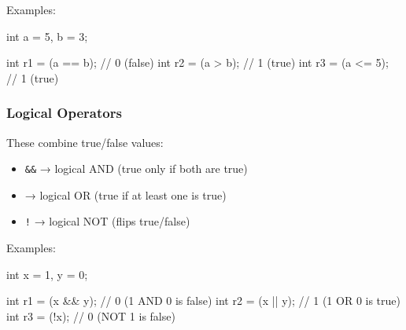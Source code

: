 \documentclass[
  letterpaper,
  DIV=11,
  numbers=noendperiod]{scrreprt}
\newenvironment{Shaded}{\begin{snugshade}}{\end{snugshade}}
\newcommand{\CommentTok}[1]{\textcolor[rgb]{0.37,0.37,0.37}{#1}}
\newcommand{\DataTypeTok}[1]{\textcolor[rgb]{0.68,0.00,0.00}{#1}}
\newcommand{\DecValTok}[1]{\textcolor[rgb]{0.68,0.00,0.00}{#1}}
\newcommand{\NormalTok}[1]{\textcolor[rgb]{0.00,0.23,0.31}{#1}}
\newcommand{\OperatorTok}[1]{\textcolor[rgb]{0.37,0.37,0.37}{#1}}
\providecommand{\tightlist}{%
  \setlength{\itemsep}{0pt}\setlength{\parskip}{0pt}}
\begin{document}
Examples:

\begin{Shaded}
\begin{Highlighting}[]
\DataTypeTok{int}\NormalTok{ a }\OperatorTok{=} \DecValTok{5}\OperatorTok{,}\NormalTok{ b }\OperatorTok{=} \DecValTok{3}\OperatorTok{;}

\DataTypeTok{int}\NormalTok{ r1 }\OperatorTok{=} \OperatorTok{(}\NormalTok{a }\OperatorTok{==}\NormalTok{ b}\OperatorTok{);}  \CommentTok{// 0 (false)}
\DataTypeTok{int}\NormalTok{ r2 }\OperatorTok{=} \OperatorTok{(}\NormalTok{a }\OperatorTok{\textgreater{}}\NormalTok{ b}\OperatorTok{);}   \CommentTok{// 1 (true)}
\DataTypeTok{int}\NormalTok{ r3 }\OperatorTok{=} \OperatorTok{(}\NormalTok{a }\OperatorTok{\textless{}=} \DecValTok{5}\OperatorTok{);}  \CommentTok{// 1 (true)}
\end{Highlighting}
\end{Shaded}

\subsubsection{Logical Operators}\label{logical-operators}

These combine true/false values:

\begin{itemize}
\tightlist
\item
  \texttt{\&\&} → logical AND (true only if both are true)
\item
  \texttt{\textbar{}\textbar{}} → logical OR (true if at least one is
  true)
\item
  \texttt{!} → logical NOT (flips true/false)
\end{itemize}

Examples:

\begin{Shaded}
\begin{Highlighting}[]
\DataTypeTok{int}\NormalTok{ x }\OperatorTok{=} \DecValTok{1}\OperatorTok{,}\NormalTok{ y }\OperatorTok{=} \DecValTok{0}\OperatorTok{;}

\DataTypeTok{int}\NormalTok{ r1 }\OperatorTok{=} \OperatorTok{(}\NormalTok{x }\OperatorTok{\&\&}\NormalTok{ y}\OperatorTok{);} \CommentTok{// 0 (1 AND 0 is false)}
\DataTypeTok{int}\NormalTok{ r2 }\OperatorTok{=} \OperatorTok{(}\NormalTok{x }\OperatorTok{||}\NormalTok{ y}\OperatorTok{);} \CommentTok{// 1 (1 OR 0 is true)}
\DataTypeTok{int}\NormalTok{ r3 }\OperatorTok{=} \OperatorTok{(!}\NormalTok{x}\OperatorTok{);}     \CommentTok{// 0 (NOT 1 is false)}
\end{Highlighting}
\end{Shaded}
\end{document}
